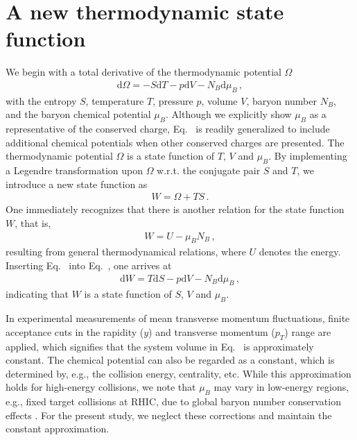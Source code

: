 \documentclass[aps,twocolumn,prd,superscriptaddress,nofootinbib,floatfix]{revtex4-2}
\begin{document}
\section{A new thermodynamic state function}
\label{sec:Wfunction}  

We begin with a total derivative of the thermodynamic potential $\Omega$
\begin{align}
    \mathrm{d} \Omega=-S \mathrm{d} T-p \mathrm{d}V-N_B \mathrm{d} \mu_B\,, \label{eq:dOmega}
\end{align}
with the entropy $S$, temperature $T$, pressure $p$, volume $V$, baryon number $N_B$, and the baryon chemical potential $\mu_B$. Although we explicitly show $\mu_B$ as a representative of the conserved charge, Eq.~ is readily generalized to include additional chemical potentials when other conserved charges are presented. The thermodynamic potential $\Omega$ is a state function of $T$, $V$ and $\mu_B$. By implementing a Legendre transformation upon $\Omega$ w.r.t. the conjugate pair $S$ and $T$, we introduce a new state function as
\begin{align}
    W=\Omega+TS\,. \label{eq:W-def}
\end{align}
One immediately recognizes that there is another relation for the state function $W$, that is,
\begin{align}
    W=U-\mu_B N_B\,,\label{}
\end{align}
resulting from general thermodynamical relations, where $U$ denotes the energy. Inserting Eq.~ into Eq.~, one arrives at
\begin{align}
    \mathrm{d} W=T\mathrm{d} S-p \mathrm{d}V-N_B \mathrm{d} \mu_B\,, \label{eq:dW}
\end{align}
indicating that $W$ is a state function of $S$, $V$ and $\mu_B$.

In experimental measurements of mean transverse momentum fluctuations, finite acceptance cuts in the rapidity ($y$) and transverse momentum ($p_{T}$) range are applied, which signifies that the system volume in Eq.~ is approximately constant. The chemical potential can also be regarded as a constant, which is determined by, e.g., the collision energy, centrality, etc. While this approximation holds for high-energy collisions, we note that $\mu_B$ may vary in low-energy regions, e.g., fixed target collisions at RHIC, due to global baryon number conservation effects \cite{Braun-Munzinger:2020jbk, Vovchenko:2021kxx, Fu:2023lcm}. For the present study, we neglect these corrections and maintain the constant approximation. 
\end{document}
